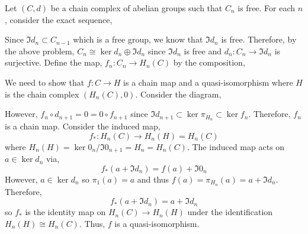 \documentclass[12pt]{extarticle}
\begin{document}
Let $(C, d)$ be a chain complex of abelian groups such that $C_n$ is free. For each $n$, consider the exact sequence,
\begin{center}
\end{center}
Since $\Im{d_n} \subset C_{n-1}$ which is a free group, we know that $\Im{d_n}$ is free. Therefore, by the above problem, $C_n \cong \ker{d_n} \oplus \Im{d_n}$ since $\Im{d_n}$ is free and $d_n : C_n \to \Im{d_n}$ is surjective. Define the map, $f_n : C_n \to H_n(C)$ by the composition,
\begin{center}
\end{center}
We need to show that $f : C \to H$ is a chain map and a quasi-isomorphism where $H$ is the chain complex $(H_n(C), 0)$. 
Consider the diagram,
\begin{center}
\end{center}
However, $f_n \circ d_{n+1} = 0 = 0 \circ f_{n+1}$ since $\Im{d_{n+1}} \subset \ker{\pi_{H_n}} \subset \ker{f_n}$. Therefore, $f_n$ is a chain map. Consider the induced map,
\[ f_* : H_n(C) \to H_n(H) = H_n(C) \]
where $H_n(H) = \ker{0_n} / \Im{0_{n+1}} = H_n = H_n(C)$. The induced map acts on $a \in \ker{d_n}$ via,
\[ f_*(a + \Im{d_n}) = f(a) + \Im{0_n} \]
However, $a \in \ker{d_n}$ so $\pi_1(a) = a$ and thus $f(a) = \pi_{H_n}(a) = a + \Im{d_n}$. Therefore, 
\[ f_*(a + \Im{d_n}) = a + \Im{d_n} \]
so $f_*$ is the identity map on $H_n(C) \to H_n(H)$ under the identification $H_n(H) \cong H_n(C)$. Thus, $f$ is a quasi-isomorphism.   
\end{document}
